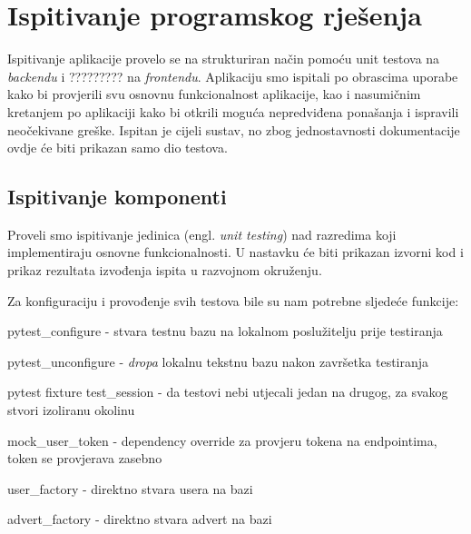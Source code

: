 			\eject 
		
	
		\section{Ispitivanje programskog rješenja}
			
			Ispitivanje aplikacije provelo se na strukturiran način pomoću unit testova na \textit{backendu} i ????????? na \textit{frontendu}. Aplikaciju smo ispitali po obrascima uporabe kako bi provjerili svu osnovnu funkcionalnost aplikacije, kao i nasumičnim kretanjem po aplikaciji kako bi otkrili moguća nepredviđena ponašanja i ispravili neočekivane greške. Ispitan je cijeli sustav, no zbog jednostavnosti dokumentacije ovdje će biti prikazan samo dio testova.
			
			\subsection{Ispitivanje komponenti}
		
			Proveli smo ispitivanje jedinica (engl. \textit{unit testing}) nad razredima koji implementiraju osnovne funkcionalnosti. U nastavku će biti prikazan izvorni kod i prikaz rezultata izvođenja ispita u razvojnom okruženju.

			Za konfiguraciju i provođenje svih testova bile su nam potrebne sljedeće funkcije: 
	
			\begin{packed_item}
			
				\item pytest{\_}configure - stvara testnu bazu na lokalnom poslužitelju prije testiranja
				\item pytest{\_}unconfigure - \textit{dropa} lokalnu tekstnu bazu nakon završetka testiranja
				\item pytest fixture test{\_}session - da testovi nebi utjecali jedan na drugog, za svakog stvori izoliranu okolinu
				\item mock{\_}user{\_}token - dependency override za provjeru tokena na endpointima, token se provjerava zasebno
				\item user{\_}factory - direktno stvara usera na bazi
				\item advert{\_}factory - direktno stvara advert na bazi
			
			\end{packed_item}

